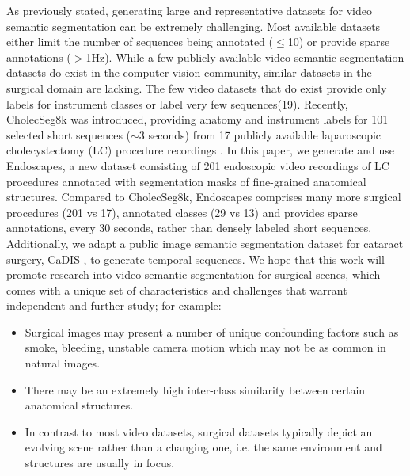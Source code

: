 \documentclass[twoside, print]{ieeecolor_arxiv}
\begin{document}
As previously stated, generating large and representative datasets for video semantic segmentation can be extremely challenging. Most available datasets either limit the number of sequences being annotated ($\leq$10)\cite{camvid} or provide sparse annotations ($>$1Hz)\cite{cityscapes}. While a few publicly available video semantic segmentation datasets do exist in the computer vision community, similar datasets in the surgical domain are lacking. The few video datasets that do exist provide only labels for instrument classes \cite{robustmis2017}\cite{cata7} or label very few sequences(19)\cite{2018roboscene}. Recently, CholecSeg8k\cite{cholecseg8k} was introduced, providing anatomy and instrument labels for 101 selected short sequences ($\sim$3 seconds) from 17 publicly available laparoscopic cholecystectomy (LC) procedure recordings \cite{endonet}. In this paper, we generate and use Endoscapes, a new dataset consisting of 201 endoscopic video recordings of LC procedures annotated with segmentation masks of fine-grained anatomical structures. Compared to CholecSeg8k, Endoscapes comprises many more surgical procedures (201 vs 17), annotated classes (29 vs 13) and provides sparse annotations, every 30 seconds, rather than densely labeled short sequences. Additionally, we adapt a public image semantic segmentation dataset for cataract surgery, CaDIS \cite{cadis}, to generate temporal sequences. We hope that this work will promote research into video semantic segmentation for surgical scenes, which comes with a unique set of characteristics and challenges that warrant independent and further study; for example:

\begin{itemize}
    \item Surgical images may present a number of unique confounding factors such as smoke, bleeding, unstable camera motion which may not be as common in natural images.
    \item There may be an extremely high inter-class similarity between certain anatomical structures.
    \item In contrast to most video datasets, surgical datasets typically depict an evolving scene rather than a changing one, i.e. the same environment and structures are usually in focus.
\end{itemize}
\end{document}
